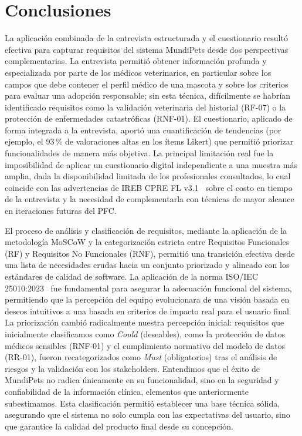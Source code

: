 \documentclass[journal,onecolumn]{IEEEtran}
\begin{document}
\newpage

\section{Conclusiones}

La aplicación combinada de la entrevista estructurada y el cuestionario
resultó efectiva para capturar requisitos del sistema MundiPets desde dos
perspectivas complementarias. La entrevista permitió obtener información
profunda y especializada por parte de los médicos veterinarios, en
particular sobre los campos que debe contener el perfil médico de una
mascota y sobre los criterios para evaluar una adopción responsable; sin
esta técnica, difícilmente se habrían identificado requisitos como la
validación veterinaria del historial (RF-07) o la protección de
enfermedades catastróficas (RNF-01). El cuestionario, aplicado de forma
integrada a la entrevista, aportó una cuantificación de tendencias (por
ejemplo, el 93\,\% de valoraciones altas en los ítems Likert) que permitió
priorizar funcionalidades de manera más objetiva. La principal limitación
real fue la imposibilidad de aplicar un cuestionario digital independiente
a una muestra más amplia, dada la disponibilidad limitada de los
profesionales consultados, lo cual coincide con las advertencias de
IREB CPRE FL v3.1~\cite{ireb2023} sobre el costo en tiempo de la entrevista
y la necesidad de complementarla con técnicas de mayor alcance en
iteraciones futuras del PFC.

El proceso de análisis y clasificación de requisitos, mediante la
aplicación de la metodología MoSCoW y la categorización estricta entre
Requisitos Funcionales (RF) y Requisitos No Funcionales (RNF), permitió una
transición efectiva desde una lista de necesidades crudas hacia un conjunto
priorizado y alineado con los estándares de calidad de software. La
aplicación de la norma ISO/IEC 25010:2023~\cite{iso25010} fue fundamental
para asegurar la adecuación funcional del sistema, permitiendo que la
percepción del equipo evolucionara de una visión basada en deseos
intuitivos a una basada en criterios de impacto real para el usuario final.
La priorización cambió radicalmente nuestra percepción inicial: requisitos
que inicialmente clasificamos como \textit{Could} (deseables), como la
protección de datos médicos sensibles (RNF-01) y el cumplimiento normativo
del modelo de datos (RR-01), fueron recategorizados como \textit{Must}
(obligatorios) tras el análisis de riesgos y la validación con los
stakeholders. Entendimos que el éxito de MundiPets no radica únicamente en
su funcionalidad, sino en la seguridad y confiabilidad de la información
clínica, elementos que anteriormente subestimamos. Esta clasificación
permitió establecer una base técnica sólida, asegurando que el sistema no
solo cumpla con las expectativas del usuario, sino que garantice la calidad
del producto final desde su concepción.
\end{document}
